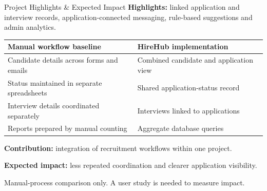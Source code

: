 \documentclass[aspectratio=169,11pt]{beamer}
\begin{document}
\begin{frame}{Project Highlights \& Expected Impact}
  \small
  \textbf{Highlights:} linked application and interview records, application-connected messaging, rule-based suggestions and admin analytics.
  \par\vspace{3mm}
  \renewcommand{\arraystretch}{1.35}
  \begin{tabularx}{\textwidth}{|Y|Y|}
    \hline
    \textbf{Manual workflow baseline} & \textbf{HireHub implementation}\\
    \hline
    Candidate details across forms and emails & Combined candidate and application view\\
    \hline
    Status maintained in separate spreadsheets & Shared application-status record\\
    \hline
    Interview details coordinated separately & Interviews linked to applications\\
    \hline
    Reports prepared by manual counting & Aggregate database queries\\
    \hline
  \end{tabularx}\par
  \par\vspace{3mm}
  \textbf{Contribution:} integration of recruitment workflows within one project.\par\smallskip
  \textbf{Expected impact:} less repeated coordination and clearer application visibility.
  \par\vspace{2mm}
  {\scriptsize\color{HireMuted} Manual-process comparison only. A user study is needed to measure impact.}
\end{frame}
\end{document}
